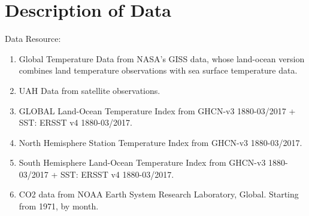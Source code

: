 \documentclass[10pt,a4paper]{article}
\begin{document}
\section{Description of Data}
Data Resource:
\begin{enumerate}
	\item Global Temperature Data from NASA's GISS data, whose land-ocean version combines land temperature observations with sea surface temperature data.
	\item UAH Data from satellite observations.
	\item GLOBAL Land-Ocean Temperature Index from GHCN-v3 1880-03/2017 + SST: ERSST v4 1880-03/2017. 
	\item North Hemisphere Station Temperature Index from GHCN-v3 1880-03/2017.
	\item South Hemisphere Land-Ocean Temperature Index from GHCN-v3 1880-03/2017 + SST: ERSST v4 1880-03/2017.
 	\item CO2 data from NOAA Earth System Research Laboratory, Global. Starting from 1971, by month.
\end{enumerate}
\end{document}

